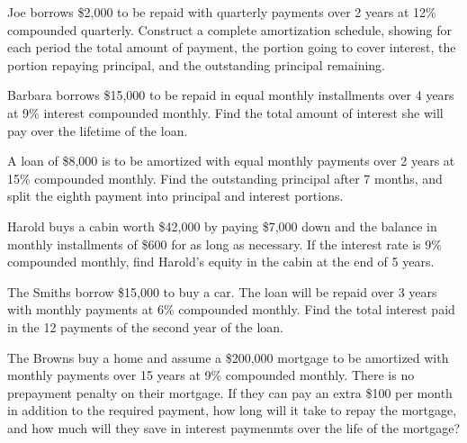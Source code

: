 \documentclass[12pt]{exam}
\begin{document}
\vspace{2in}  %

\begin{questions}

    \question Joe borrows \$2,000 to be repaid with quarterly payments over 2 years at 12\% compounded
    quarterly.  Construct a complete amortization schedule, showing for each period the total amount of payment,
    the portion going to cover interest, the portion repaying principal, and the outstanding principal remaining.
    \vspace{1.5in}

    \question Barbara borrows \$15,000 to be repaid in equal monthly installments over 4 years at 9\%
    interest compounded monthly.  Find the total amount of interest she will pay over the lifetime
    of the loan.
    \vspace{1.25in}

    \question A loan of \$8,000 is to be amortized with equal monthly payments over 2 years at 15\% compounded
    monthly.  Find the outstanding principal after 7 months, and split the eighth payment into principal
    and interest portions.
    \vspace{2in}

    \question Harold buys a cabin worth \$42,000 by paying \$7,000 down and the balance in monthly installments
    of \$600 for as long as necessary.  If the interest rate is 9\% compounded monthly, find Harold's equity
    in the cabin at the end of 5 years.
    \vspace{2in}

    \question The Smiths borrow \$15,000 to buy a car.  The loan will be repaid over 3 years with monthly payments
    at 6\% compounded monthly.  Find the total interest paid in the 12 payments of the second year of the loan.
    \vspace{2in}

    \question The Browns buy a home and assume a \$200,000 mortgage to be amortized with monthly payments over
    15 years at 9\% compounded monthly.  There is no prepayment penalty on their mortgage.  If they can pay an
    extra \$100 per month in addition to the required payment, how long will it take to repay the mortgage, and
    how much will they save in interest paymenmts over the life of the mortgage?
    \vspace{1.5in}

\end{questions}
\end{document}
